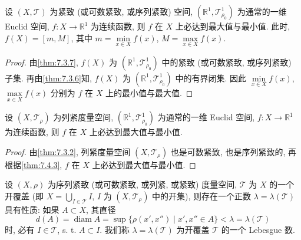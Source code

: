 \begin{theorem}[最值定理]\label{thm:7.4.3}
设 $(X, \mathcal{T})$ 为紧致 (或可数紧致, 或序列紧致) 空间, $(\mathbb{R}^{1}, \mathcal{T}_{\rho_{0}}^{1})$ 为通常的一维 Euclid 空间, $f\colon X \to \mathbb{R}^{1}$ 为连续函数, 则 $f$ 在 $X$ 上必达到最大值与最小值. 此时, $f(X) = [m, M]$, 其中 $m = \min\limits_{x \in X} f(x)$, $M = \max\limits_{x \in X} f(x)$.
\end{theorem}

\begin{proof}
由\cref{thm:7.3.7}, $f(X)$ 为 $(\mathbb{R}^{1}, \mathcal{T}_{\rho_{0}}^{1})$ 中的紧致 (或可数紧致, 或序列紧致) 子集. 再由\cref{thm:7.3.6}知, $f(X)$ 为 $(\mathbb{R}^{1}, \mathcal{T}_{\rho_{0}}^{1})$ 中的有界闭集. 因此 $\min\limits_{x \in X} f(x)$, $\max\limits_{x \in X} f(x)$ 分别为 $f$ 在 $X$ 上的最小值与最大值.
\end{proof}

\begin{corollary}\label{cor:7.4.1}
设 $(X, \mathcal{T}_{\rho})$ 为列紧度量空间, $(\mathbb{R}^{1}, \mathcal{T}_{\rho_{0}}^{1})$ 为通常的一维 Euclid 空间, $f\colon X \to \mathbb{R}^{1}$ 为连续函数, 则 $f$ 在 $X$ 上必达到最大值与最小值.
\end{corollary}

\begin{proof}
由\cref{thm:7.3.2}, 列紧度量空间 $(X, \mathcal{T}_{\rho})$ 也是可数紧致, 也是序列紧致的, 再根据\cref{thm:7.4.3}, $f$ 在 $X$ 上必达到最大值与最小值.
\end{proof}

\begin{theorem}\label{thm:7.4.4}
设 $(X, \rho)$ 为序列紧致 (或可数紧致, 或列紧, 或紧致) 度量空间, $\mathcal{T}$ 为 $X$ 的一个开覆盖 (即 $X = \bigcup\limits_{I \in \mathcal{T}} I$, $I$ 为 $(X, \mathcal{T}_{\rho})$ 中的开集), 则存在一个正数 $\lambda = \lambda(\mathcal{T})$ 具有性质: 如果 $A \subset X$, 其直径
\[
  d(A) = \operatorname{diam} A = \sup\{\rho(x', x'') \mid x', x'' \in A\} < \lambda = \lambda(\mathcal{T})
\]
时, 必有 $I \in \mathcal{T}$, s. t. $A \subset I$. 我们称 $\lambda = \lambda(\mathcal{T})$ 为开覆盖 $\mathcal{T}$ 的一个 Lebesgue 数.
\end{theorem}

